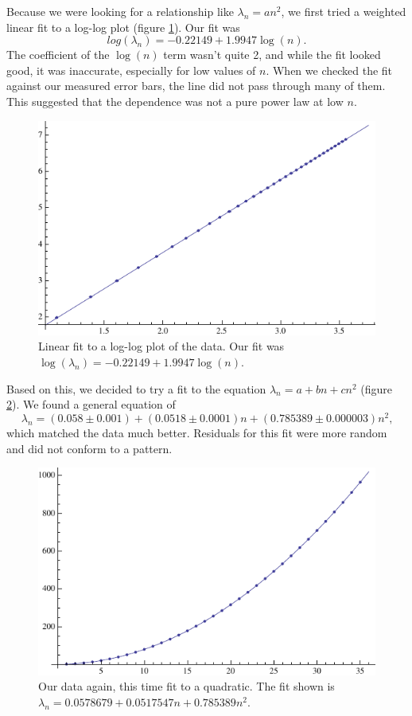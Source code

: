 \documentclass[12pt,twoside]{reedthesis}
\newcommand{\eqn}[1]{\begin{equation}#1\end{equation}}
\begin{document}
Because we were looking for a relationship like $\lambda_n = a n^2$, we first tried a weighted linear fit to a log-log plot (figure \ref{fig:loglog}). Our fit was 
\eqn{
log(\lambda_n) = -0.22149 + 1.9947 \log(n)\mbox{.}
\label{eq:logfit}
} 
The coefficient of the $\log(n)$ term wasn't quite 2, and while the fit looked good, it was inaccurate, especially for low values of $n$. When we checked the fit against our measured error bars, the line did not pass through many of them. This suggested that the dependence was not a pure power law at low $n$.
\begin{figure}[h]
\centering
\includegraphics{Figures/loglog}
\caption[Log-log fit]{Linear fit to a log-log plot of the data. Our fit was $\log(\lambda_n) = -0.22149 + 1.9947 \log(n)$.}
\label{fig:loglog}
\end{figure}

Based on this, we decided to try a fit to the equation $\lambda_n = a + b n + c n^2$ (figure \ref{fig:quadfit}). We found a general equation of 
\eqn{
\lambda_n = (0.058 \pm 0.001) + (0.0518 \pm 0.0001) n + ( 0.785389 \pm 0.000003) n^2\mbox{,}
}
which matched the data much better. Residuals for this fit were more random and did not conform to a pattern.
\begin{figure}[h]
\centering
\includegraphics{Figures/quadfit}
\caption[Quadratic fit]{Our data again, this time fit to a quadratic. The fit shown is $\lambda_n = 0.0578679 + 0.0517547 n + 0.785389 n^2$.}
\label{fig:quadfit}
\end{figure}
\end{document}
